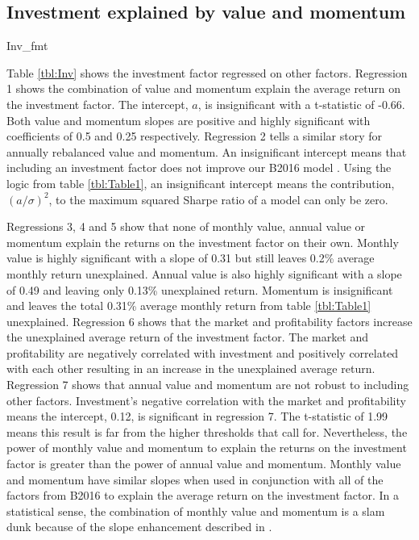
\subsection{Investment explained by value and momentum}

{Inv_fmt}

Table \ref{tbl:Inv} shows the investment factor regressed on other factors. Regression 1
shows the combination of value and momentum explain the average return on the investment
factor. The intercept, $a$, is insignificant with a t-statistic of -0.66. Both value and
momentum slopes are positive and highly significant with coefficients of 0.5 and 0.25
respectively. Regression 2 tells a similar story for annually rebalanced value and
momentum. An insignificant intercept means that including an investment factor does not
improve our B2016 model \parencite{fama1998determining, barillas2016alpha,
fama2016choosing}. Using the logic from table \ref{tbl:Table1}, an insignificant intercept
means the contribution, $(a/\sigma)^2$, to the maximum squared Sharpe ratio of a model can
only be zero.

Regressions 3, 4 and 5 show that none of monthly value, annual value or momentum explain
the returns on the investment factor on their own. Monthly value is highly significant
with a slope of 0.31 but still leaves 0.2\% average monthly return unexplained. Annual
value is also highly significant with a slope of 0.49 and leaving only 0.13\% unexplained
return. Momentum is insignificant and leaves the total 0.31\% average monthly return from
table \ref{tbl:Table1} unexplained. Regression 6 shows that the market and profitability
factors increase the unexplained average return of the investment factor. The market and
profitability are negatively correlated with investment and positively correlated with
each other resulting in an increase in the unexplained average return. Regression 7 shows
that annual value and momentum are not robust to including other factors. Investment's
negative correlation with the market and profitability means the intercept, 0.12, is
significant in regression 7. The t-statistic of 1.99 means this result is far from the
higher thresholds that \textcite{harvey2016and} call for. Nevertheless, the power of
monthly value and momentum to explain the returns on the investment factor is greater than
the power of annual value and momentum. Monthly value and momentum have similar slopes
when used in conjunction with all of the factors from B2016 to explain the average return
on the investment factor. In a statistical sense, the combination of monthly value and
momentum is a slam dunk because of the slope enhancement described in
\textcite{fama2015incremental}.


